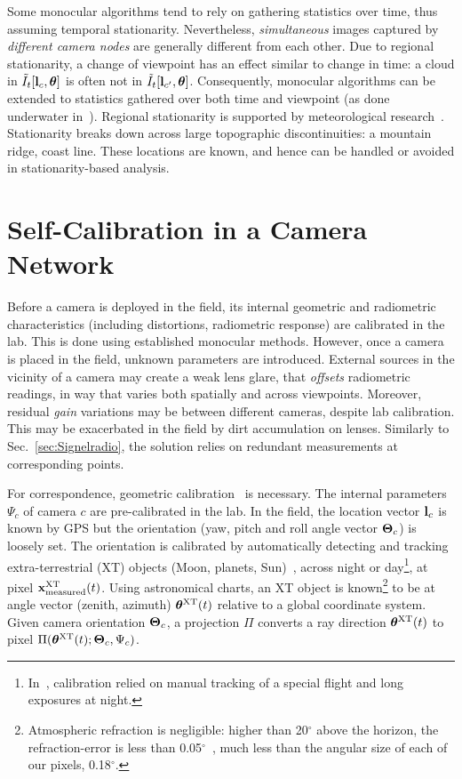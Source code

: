\documentclass[runningheads]{llncs}
\begin{document}
Some monocular algorithms tend to rely on gathering statistics over time, thus assuming temporal stationarity. Nevertheless, {\em simultaneous} images captured by {\em different camera nodes} are generally different from each other. Due to regional stationarity, a change of viewpoint has an effect similar to change in time: a cloud in
$\tilde I_t[{\bf l}_c,{\bm \theta}]$ is often not in $\tilde I_t[{\bf l}_{c'},{\bm \theta}]$. Consequently, monocular algorithms can be extended to statistics gathered over both time and viewpoint (as done underwater in~\cite{6528314}).
Regional stationarity is supported by meteorological research~\cite{lensky2006time,Mesoscale}.
Stationarity breaks down across large topographic discontinuities: a mountain ridge, coast line. These locations are known, and hence can be handled or avoided in stationarity-based analysis.



\section{Self-Calibration in a Camera Network}
\label{sec:muticalib}

Before a camera is deployed in the field, its internal geometric and radiometric characteristics (including distortions, radiometric response) are calibrated in the lab. This is done using established monocular methods. However, once a camera is placed in the field, unknown parameters are introduced. External sources in the vicinity of a camera may create a weak lens glare, that {\em offsets} radiometric readings, in way that varies both spatially and across viewpoints. Moreover, residual {\em gain} variations may be between different cameras, despite lab calibration. This may be exacerbated in the field by dirt accumulation on lenses. Similarly to Sec.~\ref{sec:Signelradio}, the solution relies on redundant measurements at corresponding points.

For correspondence, geometric calibration~\cite{Seiz2002} is necessary. The internal parameters $\Psi_c$ of camera $c$ are pre-calibrated in the lab.
In the field, the location vector ${\bf l}_c$ is known by GPS but the orientation (yaw, pitch and roll angle vector ${\bf \Theta}_c$) is loosely set. The orientation is calibrated by automatically detecting and tracking extra-terrestrial (XT) objects (Moon, planets, Sun)~\cite{Seiz2002,lalonde}, across night or day\footnote{In~\cite{Seiz2002}, calibration relied on manual tracking of a special flight and long exposures at night.}, at pixel ${\bf x}^{\rm XT}_{\rm measured}(t)$. Using astronomical charts, an XT object is known\footnote{Atmospheric refraction is negligible: higher than 20$^{\circ}$ above the horizon, the refraction-error is less than 0.05$^{\circ}$~\cite{NAV:6418444}, much less than the angular size of each of our pixels, 0.18$^{\circ}$.} to be at angle vector (zenith, azimuth) ${\bm \theta}^{\rm XT}(t)$ relative to a global coordinate system. Given camera orientation ${\bf \Theta}_c$, a projection ${\Pi}$ converts a ray direction ${\bm \theta}^{\rm XT}(t)$ to pixel ${{\Pi}({\bm \theta}^{\rm XT}(t);{\bf \Theta}_c,\Psi_c)}$.
\end{document}
